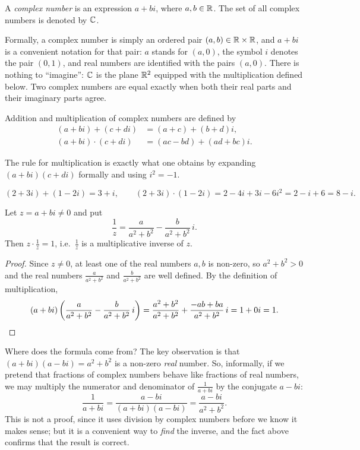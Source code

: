 \begin{definition}
A \emph{complex number} is an expression $a+bi$, where $a,b\in \mathbb{R}$. The set of all complex numbers is denoted
by $\mathbb{C}$.
\end{definition}

\begin{remark}
Formally, a complex number is simply an ordered pair $(a,b)\in\mathbb{R}\times\mathbb{R}$, and $a+bi$ is a convenient
notation for that pair: $a$ stands for $(a,0)$, the symbol $i$ denotes the pair $(0,1)$, and real numbers
are identified with the pairs $(a,0)$. There is nothing to ``imagine'': $\mathbb{C}$ is the plane $\mathbb{R}^2$ equipped
with the multiplication defined below. Two complex numbers are equal exactly when both their real parts and
their imaginary parts agree.
\end{remark}

\begin{definition}
Addition and multiplication of complex numbers are defined by
\[
\begin{aligned}
(a+bi)+(c+di) &= (a+c) + (b+d)i,\\
(a+bi)\cdot(c+di) &= (ac-bd)+ (ad+bc)i.
\end{aligned}
\]
\end{definition}

\noindent The rule for multiplication is exactly what one obtains by expanding $(a+bi)(c+di)$ formally and
using $i^2=-1$.

\begin{example}
\[
(2+3i)+(1-2i) = 3+i, \qquad
(2+3i)\cdot(1-2i) = 2-4i+3i-6i^2 = 2-i+6 = 8-i.
\]
\end{example}

\begin{fact}[Inversion]
Let $z=a+bi\neq 0$ and put
\[
\frac{1}{z} = \frac{a}{a^2+b^2}-\frac{b}{a^2+b^2}\,i.
\]
Then $z\cdot\frac1z = 1$, i.e.\ $\frac1z$ is a multiplicative inverse of $z$.
\end{fact}

\begin{proof}
Since $z\neq 0$, at least one of the real numbers $a,b$ is non-zero, so $a^2+b^2>0$ and the real numbers
$\frac{a}{a^2+b^2}$ and $\frac{b}{a^2+b^2}$ are well defined. By the definition of multiplication,
\[
(a+bi)\left(\frac{a}{a^2+b^2}-\frac{b}{a^2+b^2}\,i\right)
= \frac{a^2+b^2}{a^2+b^2} + \frac{-ab+ba}{a^2+b^2}\,i = 1+0i = 1. \qedhere
\]
\end{proof}

\begin{remark}
Where does the formula come from? The key observation is that $(a+bi)(a-bi)=a^2+b^2$ is a non-zero
\emph{real} number. So, informally, if we pretend that fractions of complex numbers behave like fractions of
real numbers, we may multiply the numerator and denominator of $\frac{1}{a+bi}$ by the conjugate $a-bi$:
\[
\frac{1}{a+bi} =\frac{a-bi}{(a+bi)(a-bi)} = \frac{a-bi}{a^2+b^2}.
\]
This is not a proof, since it uses division by complex numbers before we know it makes sense; but it is a
convenient way to \emph{find} the inverse, and the fact above confirms that the result is correct.
\end{remark}

